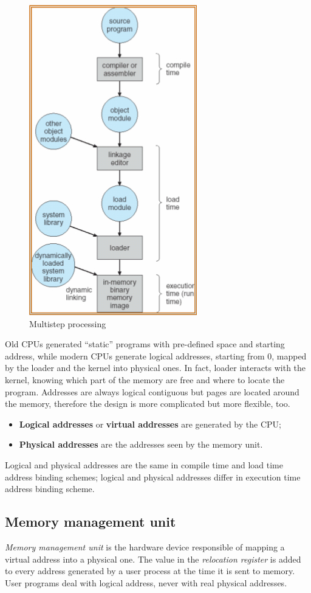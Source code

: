 \begin{figure}[hbtp]
\centering
\includegraphics[scale=0.6]{images/memory_management/multistep_processing.jpg}
\caption{Multistep processing}
\end{figure}

Old CPUs generated ``static'' programs with pre-defined space and starting address, while modern CPUs generate logical addresses, starting from 0, mapped by the loader and the kernel into physical ones. In fact, loader interacts with the kernel, knowing which part of the memory are free and where to locate the program.
Addresses are always logical contiguous but pages are located around the memory, therefore the design is more complicated but more flexible, too.

\begin{itemize}
\item \textbf{Logical addresses} or \textbf{virtual addresses} are generated by the CPU;
\item \textbf{Physical addresses} are the addresses seen by the memory unit.
\end{itemize}
Logical and physical addresses are the same in compile time and load time address binding schemes; logical and physical addresses differ in execution time address binding scheme.

\subsection*{Memory management unit}
\emph{Memory management unit} is the hardware device responsible of mapping a virtual address into a physical one. The value in the \emph{relocation register} is added to every address generated by a user process at the time it is sent to memory. User programs deal with logical address, never with real physical addresses.

